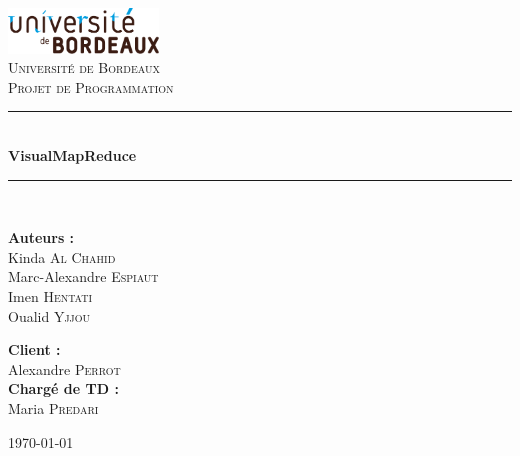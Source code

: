 \documentclass[12pt,a4paper]{article}
\newcommand{\HRule}{\rule{\linewidth}{0.5mm}}
\begin{document}
\begin{titlepage}
\begin{center}

\includegraphics[width=0.3\textwidth]{images/universite_bordeaux_logo.pdf}\\[1cm]    

\textsc{\LARGE Université de Bordeaux}\\[1.5cm]

\textsc{\Large Projet de Programmation}\\[0.5cm]

\vspace{30pt}
\HRule \\[0.4cm]
{ \huge \bfseries VisualMapReduce}\\[0.4cm]

\HRule \\[1.5cm]

\begin{minipage}{0.4\textwidth}
\begin{flushleft} \large
\textbf{Auteurs :}\\
Kinda \textsc{Al Chahid}\\
Marc-Alexandre \textsc{Espiaut}\\
Imen \textsc{Hentati}\\
Oualid \textsc{Yjjou}
\end{flushleft}
\end{minipage}
\begin{minipage}{0.4\textwidth}
\begin{flushright} \large
\textbf{Client :} \\
Alexandre \textsc{Perrot}\\
\textbf{Chargé de TD :} \\
Maria \textsc{Predari}
\end{flushright}
\end{minipage}

\vfill

{\large \today}

\end{center}

\end{titlepage}


\tableofcontents
\newpage
\end{document}
